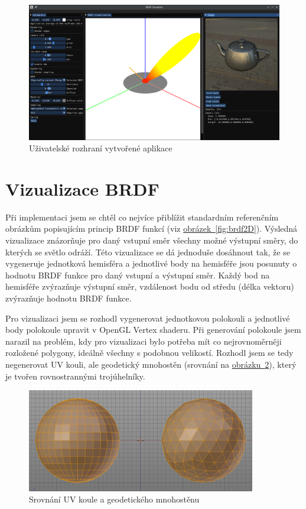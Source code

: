 \documentclass[czech,master]{diploma}
\begin{document}
\begin{figure}[ht]
  \centering
  \includegraphics[width=15cm]{Figures/visualizations/MyBRDFVizApp.png}
  \caption{Uživatelské rozhraní vytvořené aplikace}%
  \label{fig:myapp}%
\end{figure}

\section{Vizualizace BRDF}
Při implementaci jsem se chtěl co nejvíce přiblížit standardním referenčním obrázkům popisujícím princip BRDF funkcí (viz \hyperref[fig:brdf2D]{obrázek~\ref{fig:brdf2D}}). Výsledná vizualizace znázorňuje  pro daný vstupní směr všechny možné výstupní směry, do kterých se světlo odráží. Této vizualizace se dá jednoduše dosáhnout tak, že se vygeneruje jednotková hemisféra a jednotlivé body na hemisféře jsou posunuty o hodnotu BRDF funkce pro daný vstupní a výstupní směr. Každý bod na hemisféře zvýrazňuje výstupní směr, vzdálenost bodu od středu (délka vektoru) zvýrazňuje hodnotu BRDF funkce.\par
Pro vizualizaci jsem se rozhodl vygenerovat jednotkovou polokouli a jednotlivé body polokoule upravit v OpenGL Vertex shaderu. Při generování polokoule jsem narazil na problém, kdy pro vizualizaci bylo potřeba mít co nejrovnoměrněji rozložené polygony, ideálně všechny s podobnou velikostí. Rozhodl jsem se tedy negenerovat UV kouli, ale geodetický mnohostěn (srovnání na \hyperref[fig:spheresComparison]{obrázku~\ref{fig:spheresComparison}}), který je tvořen rovnostrannými trojúhelníky.\par

\begin{figure}[ht]
  \centering
  \includegraphics[width=10cm]{Figures/IcosphereUVSphereComparison.png}
  \caption[Srovnání UV koule a geodetického mnohostěnu]{Srovnání UV koule a geodetického mnohostěnu~\cite{tan_2019}}
  \label{fig:spheresComparison}
\end{figure}
\end{document}
